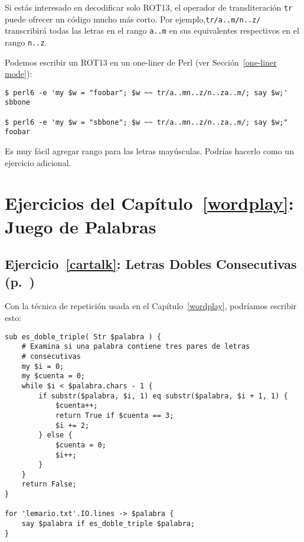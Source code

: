 Si estás interesado en decodificar solo ROT13, el operador
de transliteración {\tt tr} puede ofrecer un código mucho
más corto. Por ejemplo,{\tt tr/a..m/n..z/} transcribirá
todas las letras en el rango {\tt a..m} en sus equivalentes
respectivos en el rango {\tt n..z}.

Podemos escribir un ROT13 en un one-liner de Perl (ver Sección~\ref{one-liner mode}):
\label{rot13_oneliner}

\begin{verbatim}
$ perl6 -e 'my $w = "foobar"; $w ~~ tr/a..mn..z/n..za..m/; say $w;'
sbbone

$ perl6 -e 'my $w = "sbbone"; $w ~~ tr/a..mn..z/n..za..m/; say $w;"
foobar
\end{verbatim}

Es muy fácil agregar rango para las letras mayúsculas. Podrías hacerlo como
un ejercicio adicional.


\section{Ejercicios del Capítulo~\ref{wordplay}: Juego de Palabras}

\subsection{Ejercicio~\ref{cartalk}: Letras Dobles Consecutivas (p.~\pageref{cartalk})}
\label{sol_cartalk}

Con la técnica de repetición usada en el Capítulo~\ref{wordplay}, 
podríamos escribir esto:

\begin{verbatim}
sub es_doble_triple( Str $palabra ) {
    # Examina si una palabra contiene tres pares de letras
    # consecutivas
    my $i = 0;
    my $cuenta = 0;
    while $i < $palabra.chars - 1 {
        if substr($palabra, $i, 1) eq substr($palabra, $i + 1, 1) {
            $cuenta++;
            return True if $cuenta == 3;
            $i += 2;
        } else {
            $cuenta = 0;
            $i++;
        }
    }
    return False;
}

for 'lemario.txt'.IO.lines -> $palabra {
    say $palabra if es_doble_triple $palabra;
}
\end{verbatim}
%

